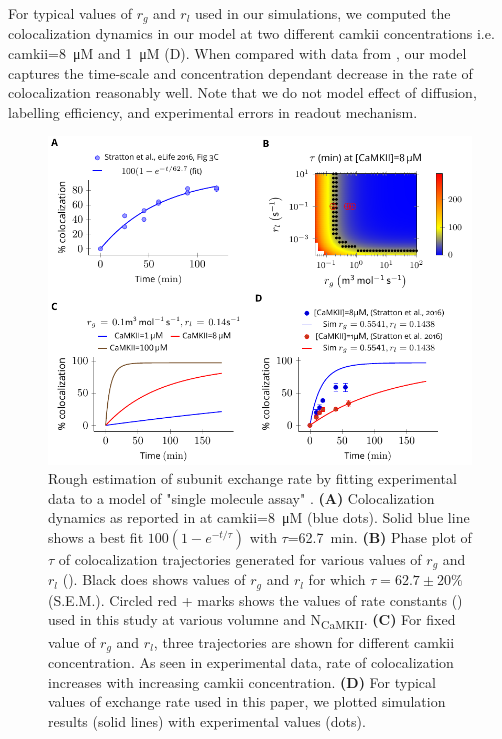 \documentclass[9pt,lineno,doublespacing]{elife}
\newcommand\SUB[2]{#1\textsubscript{#2}}
\begin{document}
{For typical values of $r_g$ and $r_l$ used in our simulations, we computed the
colocalization dynamics in our model at two different \gls{camkii}
concentrations i.e. \gls{camkii}=\SI{8}{\micro M} and \SI{1}{\micro M}
(D). When compared with data from
\cite{stratton_activation-triggered_2014}, our model captures the time-scale and
concentration dependant decrease in the rate of colocalization reasonably well.
Note that we do not model effect of diffusion, labelling efficiency, and
experimental errors in readout mechanism.  

\begin{figure}[ht!]
    \includegraphics[width=\linewidth]{./PaperFigures/elifeFigure8/figure_exchange_rate.pdf}
    \caption{Rough estimation of subunit exchange rate by fitting experimental
        data to a model of "single molecule assay" \cite{stratton_activation-triggered_2014}. 
        \textbf{(A)} Colocalization
        dynamics as reported in \cite{stratton_activation-triggered_2014} at
        \gls{camkii}=\SI{8}{\micro M} (blue dots). Solid blue line shows a best
        fit $100(1-e^{-t/\tau})$ with $\tau$=\SI{62.7}{min}. \textbf{(B)} Phase
        plot of $\tau$ of colocalization trajectories generated for various
        values of $r_g$ and $r_l$ (). Black does shows values
        of $r_g$ and $r_l$ for which $\tau=62.7\pm 20\%$ (S.E.M.). Circled red +
        marks shows the values of rate constants () used in this 
        study at various volumne and \SUB{N}{CaMKII}. \textbf{(C)} For fixed value of $r_g$ and
        $r_l$, three trajectories are shown for different \gls{camkii}
        concentration. As seen in experimental data, rate of colocalization
        increases with increasing \gls{camkii} concentration. \textbf{(D)} For
        typical values of exchange rate used in this paper, we plotted
        simulation results (solid lines) with experimental values (dots).
    }\label{fig:estimate_of_exchange_rate}
\end{figure}



}
\end{document}
